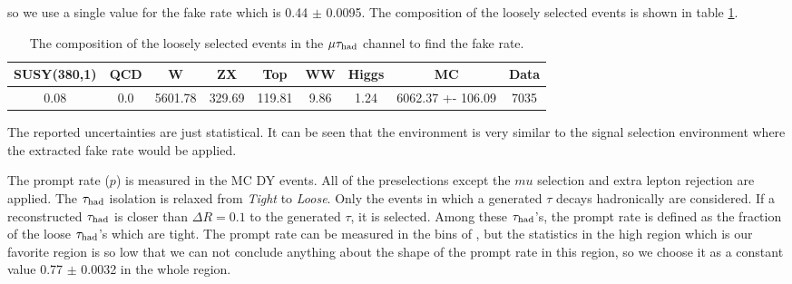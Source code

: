so we use a single value for the fake rate which is 0.44 $\pm$ 0.0095. The composition of the loosely selected events is shown in table \ref{tbl:Composition}. 
\begin{table}[!Hhtb]
\begin{center}
\begin{tabular}{ccccccccc}
\hline
\hline
  SUSY(380,1) & QCD &    W    & ZX     &    Top    &  WW  & Higgs &                MC & Data \\
\hline
 0.08         & 0.0 & 5601.78 & 329.69 &   119.81  & 9.86 & 1.24  & 6062.37 +- 106.09 & 7035\\
\hline
\hline
\end{tabular}
\caption{The composition of the loosely selected events in the $\mu\tau_{\rm had}$ channel to find the fake rate.}
\label{tbl:Composition}
\end{center}
\end{table}
The reported uncertainties are just statistical. It can be seen that the environment is very similar to the signal selection environment where the 
extracted fake rate would be applied.

The prompt rate ($p$) is measured in the MC DY events. All of the preselections except the $mu$ selection and extra lepton rejection %
are applied. 
The $\tau_{\rm had}$ isolation 
is relaxed from {\it Tight} to {\it Loose}. Only the events in which a generated $\tau$ decays hadronically are considered. If a reconstructed $\tau_{\rm had}$ is 
closer than $\Delta R = 0.1$ to the generated $\tau$, it is selected. Among these $\tau_{\rm had}$'s, the prompt rate is defined as the fraction of the loose $\tau_{\rm had}$'s 
which are tight. The prompt rate can be measured in the bins of \mttwo, but the statistics in the high \mttwo region which is our favorite 
region is so low that we can not conclude anything about the shape of the prompt rate in this region, so we choose it as a constant value
0.77 $\pm$ 0.0032 in the whole \mttwo region.

